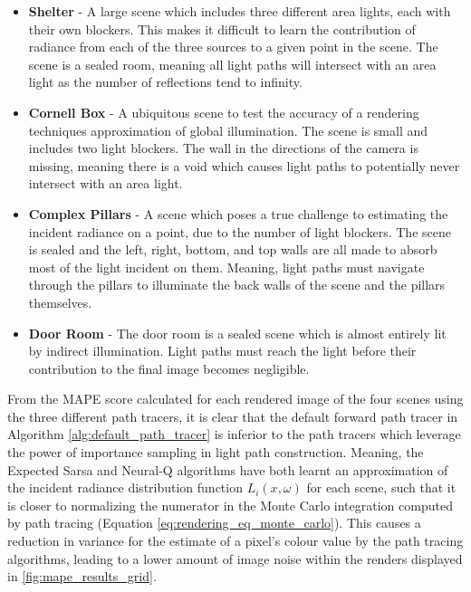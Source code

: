 \documentclass[../dissertation.tex]{subfiles}
\begin{document}
\begin{itemize}
\item \textbf{Shelter} - A large scene which includes three different area lights, each with their own blockers. This makes it difficult to learn the contribution of radiance from each of the three sources to a given point in the scene. The scene is a sealed room, meaning all light paths will intersect with an area light as the number of reflections tend to infinity.

\item \textbf{Cornell Box} - A ubiquitous scene to test the accuracy of a rendering techniques approximation of global illumination. The scene is small and includes two light blockers. The wall in the directions of the camera is missing, meaning there is a void which causes light paths to potentially never intersect with an area light.

\item \textbf{Complex Pillars} - A scene which poses a true challenge to estimating the incident radiance on a point, due to the number of light blockers. The scene is sealed and the left, right, bottom, and top walls are all made to absorb most of the light incident on them. Meaning, light paths must navigate through the pillars to illuminate the back walls of the scene and the pillars themselves.

\item \textbf{Door Room} - The door room is a sealed scene which is almost entirely lit by indirect illumination. Light paths must reach the light before their contribution to the final image becomes negligible. 
\end{itemize}

From the MAPE score calculated for each rendered image of the four scenes using the three different path tracers, it is clear that the default forward path tracer in Algorithm \ref{alg:default_path_tracer} is inferior to the path tracers which leverage the power of importance sampling in light path construction. Meaning, the Expected Sarsa and Neural-Q algorithms have both learnt an approximation of the incident radiance distribution function $L_i(x, \omega)$ for each scene, such that it is closer to normalizing the numerator in the Monte Carlo integration computed by path tracing (Equation \ref{eq:rendering_eq_monte_carlo}). This causes a reduction in variance for the estimate of a pixel's colour value by the path tracing algorithms, leading to a lower amount of image noise within the renders displayed in \ref{fig:mape_results_grid}.\\
\end{document}
